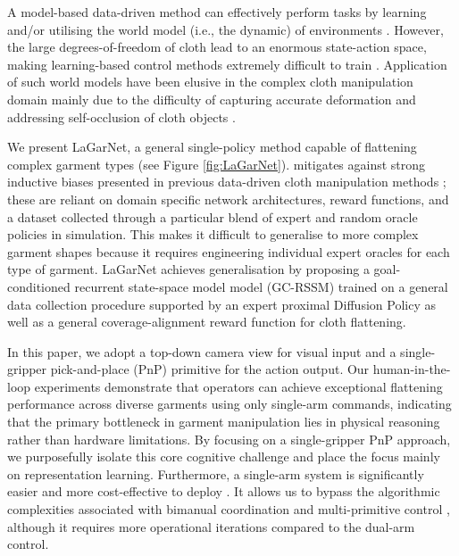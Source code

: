\documentclass[journal]{IEEEtran}
\begin{document}
A model-based data-driven method can effectively perform tasks by learning and/or utilising the world model (i.e., the dynamic) of environments \cite{ha2018world, hafner2019learning,hafner2020dream, deng2023facing}. However, the large degrees-of-freedom of cloth lead to an enormous state-action space, making learning-based control methods extremely difficult to train \cite{kadi2023data}. Application of such world models have been elusive in the complex cloth manipulation domain mainly due to the difficulty of capturing accurate deformation and addressing self-occlusion of cloth objects \cite{ma2021learning,yan2021learning,lin2020softgym}. 

We present LaGarNet, a general single-policy method capable of flattening  complex garment types (see Figure \ref{fig:LaGarNet}).  mitigates against strong inductive biases presented in previous data-driven cloth manipulation methods \cite{kadi2025draper, weng2022fabricflownet, hoque2022visuospatial}; these are reliant on domain specific network architectures, reward functions, and a dataset collected through a particular blend of expert and random oracle policies in simulation. This makes it difficult to generalise to more complex garment shapes because it requires engineering individual expert oracles for each type of garment. LaGarNet achieves generalisation by proposing a goal-conditioned recurrent state-space model model (GC-RSSM)  trained on a general data collection procedure supported by an expert proximal Diffusion Policy  as well as a general coverage-alignment reward function for cloth flattening. 

In this paper, we adopt a top-down camera view for visual input and a single-gripper pick-and-place (PnP) primitive for the action output. Our human-in-the-loop experiments demonstrate that operators can achieve exceptional flattening performance across diverse garments using only single-arm commands, indicating that the primary bottleneck in garment manipulation lies in physical reasoning rather than hardware limitations. By focusing on a single-gripper PnP approach, we purposefully isolate this core cognitive challenge and place the focus mainly on representation learning. Furthermore, a single-arm system is significantly easier and more cost-effective to deploy \cite{ha2022flingbot, avigal2022speedfolding}. It allows us to bypass the algorithmic complexities associated with bimanual coordination and multi-primitive control \cite{canberk2023cloth}, although it requires more operational iterations compared to the dual-arm control.
\end{document}
